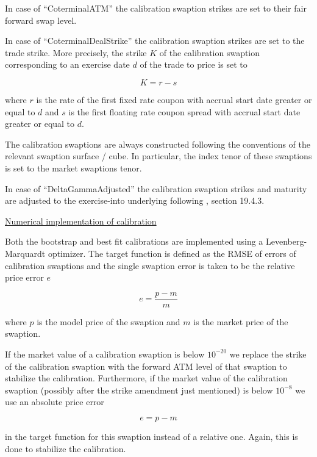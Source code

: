 In case of ``CoterminalATM'' the calibration swaption strikes are set to their fair forward swap level.

In case of ``CoterminalDealStrike'' the calibration swaption strikes are set to the trade strike. More precisely, the
strike $K$ of the calibration swaption corresponding to an exercise date $d$ of the trade to price is set to

\begin{equation}
K = r - s
\end{equation}

where $r$ is the rate of the first fixed rate coupon with accrual start date greater or equal to $d$ and $s$ is the
first floating rate coupon spread with accrual start date greater or equal to $d$.

The calibration swaptions are always constructed following the conventions of the relevant swaption surface / cube. In
particular, the index tenor of these swaptions is set to the market swaptions tenor.

In case of ``DeltaGammaAdjusted'' the calibration swaption strikes and maturity are adjusted to the exercise-into
underlying following \cite{Andersen_Piterbarg_2010}, section 19.4.3.

\underline{Numerical implementation of calibration}

Both the bootstrap and best fit calibrations are implemented using a Levenberg-Marquardt optimizer. The target function
is defined as the RMSE of errors of calibration swaptions and the single swaption error is taken to be the relative
price error $e$

\begin{equation}
e = \frac{p-m}{m}
\end{equation}

where $p$ is the model price of the swaption and $m$ is the market price of the swaption.

If the market value of a calibration swaption is below $10^{-20}$ we replace the strike of the calibration swaption with
the forward ATM level of that swaption to stabilize the calibration. Furthermore, if the market value of the calibration
swaption (possibly after the strike amendment just mentioned) is below $10^{-8}$ we use an absolute price error

\begin{equation}
e = {p-m}
\end{equation}

in the target function for this swaption instead of a relative one. Again, this is done to stabilize the calibration.

